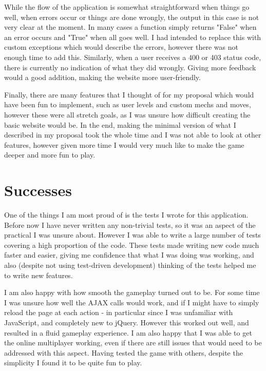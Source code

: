 \documentclass{article}
\begin{document}
While the flow of the application is somewhat straightforward when things go well, when errors occur or things are done wrongly, the output in this case is not very clear at the moment. In many cases a function simply returns "False" when an error occurs and "True" when all goes well. I had intended to replace this with custom exceptions which would describe the errors, however there was not enough time to add this. Similarly, when a user receives a 400 or 403 status code, there is currently no indication of what they did wrongly. Giving more feedback would a good addition, making the website more user-friendly.

Finally, there are many features that I thought of for my proposal which would have been fun to implement, such as user levels and custom mechs and moves, however these were all stretch goals, as I was unsure how difficult creating the basic website would be. In the end, making the minimal version of what I described in my proposal took the whole time and I was not able to look at other features, however given more time I would very much like to make the game deeper and more fun to play.

\section{Successes}

One of the things I am most proud of is the tests I wrote for this application. Before now I have never written any non-trivial tests, so it was an aspect of the practical I was unsure about. However I was able to write a large number of tests covering a high proportion of the code. These tests made writing new code much faster and easier, giving me confidence that what I was doing was working, and also (despite not using test-driven development) thinking of the tests helped me to write new features.

I am also happy with how smooth the gameplay turned out to be. For some time I was unsure how well the AJAX calls would work, and if I might have to simply reload the page at each action - in particular since I was unfamiliar with JavaScript, and completely new to jQuery. However this worked out well, and resulted in a fluid gameplay experience. I am also happy that I was able to get the online multiplayer working, even if there are still issues that would need to be addressed with this aspect. Having tested the game with others, despite the simplicity I found it to be quite fun to play.
\end{document}
